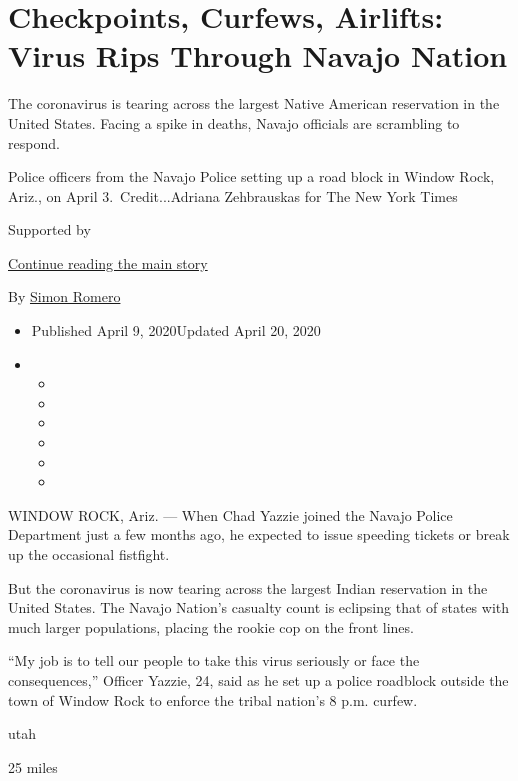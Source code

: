\hypertarget{checkpoints-curfews-airlifts-virus-rips-through-navajo-nation}{%
\section{Checkpoints, Curfews, Airlifts: Virus Rips Through Navajo
Nation}\label{checkpoints-curfews-airlifts-virus-rips-through-navajo-nation}}

The coronavirus is tearing across the largest Native American
reservation in the United States. Facing a spike in deaths, Navajo
officials are scrambling to respond.

Police officers from the Navajo Police setting up a road block in Window
Rock, Ariz., on April 3.~Credit...Adriana Zehbrauskas for The New York
Times

Supported by

\protect\hyperlink{after-sponsor}{Continue reading the main story}

By \href{https://www.nytimes.com/by/simon-romero}{Simon Romero}

\begin{itemize}
\item
  Published April 9, 2020Updated April 20, 2020
\item
  \begin{itemize}
  \item
  \item
  \item
  \item
  \item
  \item
  \end{itemize}
\end{itemize}

WINDOW ROCK, Ariz. --- When Chad Yazzie joined the Navajo Police
Department just a few months ago, he expected to issue speeding tickets
or break up the occasional fistfight.

But the coronavirus is now tearing across the largest Indian reservation
in the United States. The Navajo Nation's casualty count is eclipsing
that of states with much larger populations, placing the rookie cop on
the front lines.

``My job is to tell our people to take this virus seriously or face the
consequences,'' Officer Yazzie, 24, said as he set up a police roadblock
outside the town of Window Rock to enforce the tribal nation's 8 p.m.
curfew.

utah

25 miles


